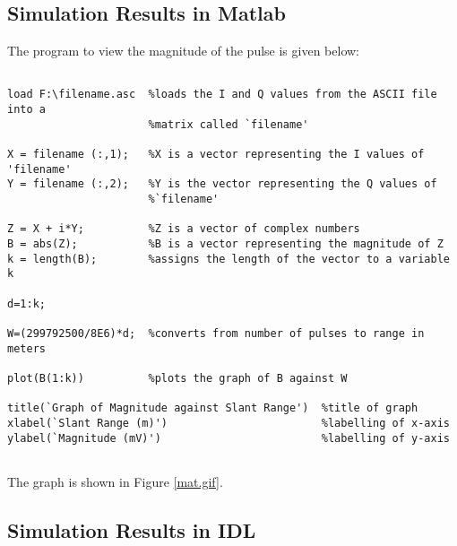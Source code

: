 \subsection{\protect\smallskip Simulation Results in Matlab}

The program to view the magnitude of the pulse is given below:
\begin{verbatim}
 
load F:\filename.asc  %loads the I and Q values from the ASCII file into a
                      %matrix called `filename'
 
X = filename (:,1);   %X is a vector representing the I values of 'filename'
Y = filename (:,2);   %Y is the vector representing the Q values of
                      %`filename'
 
Z = X + i*Y;          %Z is a vector of complex numbers
B = abs(Z);           %B is a vector representing the magnitude of Z
k = length(B);        %assigns the length of the vector to a variable k
 
d=1:k;             
 
W=(299792500/8E6)*d;  %converts from number of pulses to range in meters
 
plot(B(1:k))          %plots the graph of B against W
 
title(`Graph of Magnitude against Slant Range')  %title of graph
xlabel(`Slant Range (m)')                        %labelling of x-axis
ylabel(`Magnitude (mV)')                         %labelling of y-axis
 
\end{verbatim}

The graph is shown in Figure \ref{mat.gif}.


\smallskip

\smallskip 
\pagebreak%

\subsection{\protect\smallskip Simulation Results in IDL}

